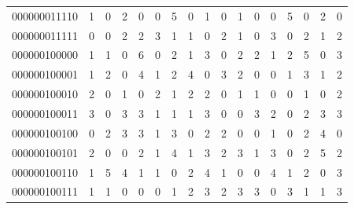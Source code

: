 \documentclass[10pt,a4paper]{article}
\begin{document}
\begin{longtable}{ |c|c|c|c|c|c|c|c|c|c|c|c|c|c|c|c|c| }
    000000011110              & 1                            & 0                                & 2                            & 0                              & 0   & 5   & 0   & 1   & 0   & 1   & 0   & 0   & 5   & 0   & 2   & 0   \\
    000000011111              & 0                            & 0                                & 2                            & 2                              & 3   & 1   & 1   & 0   & 2   & 1   & 0   & 3   & 0   & 2   & 1   & 2   \\
    000000100000              & 1                            & 1                                & 0                            & 6                              & 0   & 2   & 1   & 3   & 0   & 2   & 2   & 1   & 2   & 5   & 0   & 3   \\
    000000100001              & 1                            & 2                                & 0                            & 4                              & 1   & 2   & 4   & 0   & 3   & 2   & 0   & 0   & 1   & 3   & 1   & 2   \\
    000000100010              & 2                            & 0                                & 1                            & 0                              & 2   & 1   & 2   & 2   & 0   & 1   & 1   & 0   & 0   & 1   & 0   & 2   \\
    000000100011              & 3                            & 0                                & 3                            & 3                              & 1   & 1   & 1   & 3   & 0   & 0   & 3   & 2   & 0   & 2   & 3   & 3   \\
    000000100100              & 0                            & 2                                & 3                            & 3                              & 1   & 3   & 0   & 2   & 2   & 0   & 0   & 1   & 0   & 2   & 4   & 0   \\
    000000100101              & 2                            & 0                                & 0                            & 2                              & 1   & 4   & 1   & 3   & 2   & 3   & 1   & 3   & 0   & 2   & 5   & 2   \\
    000000100110              & 1                            & 5                                & 4                            & 1                              & 1   & 0   & 2   & 4   & 1   & 0   & 0   & 4   & 1   & 2   & 0   & 3   \\
    000000100111              & 1                            & 1                                & 0                            & 0                              & 0   & 1   & 2   & 3   & 2   & 3   & 3   & 0   & 3   & 1   & 1   & 3   \\

\end{longtable}
\end{document}
